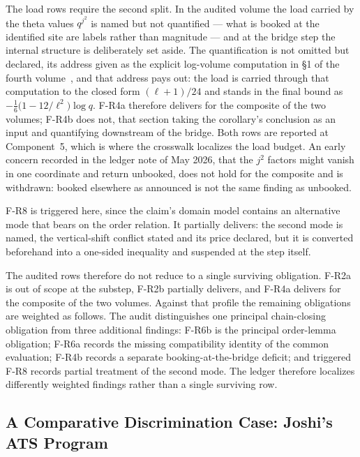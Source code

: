 \documentclass[11pt,a4paper]{article}
\begin{document}
The load rows require the second split. In the audited volume the load carried
by the theta values $q^{j^2}$ is named but not quantified --- what is booked at
the identified site are labels rather than magnitude --- and at the bridge step
the internal structure is deliberately set aside. The quantification is not
omitted but declared, its address given as the explicit log-volume computation
in \S1 of the fourth volume~\cite{Mochizuki2021d}, and that address pays out:
the load is carried through that computation to the closed form $(\ell+1)/24$
and stands in the final bound as
$-\tfrac{1}{6}\bigl(1-12/\ell^{2}\bigr)\log q$. F-R4a therefore delivers for the
composite of the two volumes; F-R4b does not, that section taking the
corollary's conclusion as an input and quantifying downstream of the bridge.
Both rows are reported at Component~5, which is where the crosswalk localizes
the load budget. An early concern recorded in the ledger note of May 2026, that
the $j^2$ factors might vanish in one coordinate and return unbooked, does not
hold for the composite and is withdrawn: booked elsewhere as announced is not
the same finding as unbooked.

F-R8 is triggered here, since the claim's domain model contains an alternative
mode that bears on the order relation. It partially delivers: the second mode is
named, the vertical-shift conflict stated and its price declared, but it is
converted beforehand into a one-sided inequality and suspended at the step
itself.

The audited rows therefore do not reduce to a single surviving obligation.
F-R2a is out of scope at the substep, F-R2b partially delivers, and F-R4a
delivers for the composite of the two volumes. Against that profile the
remaining obligations are weighted as follows. The audit distinguishes one
principal chain-closing obligation from three additional findings: F-R6b is the
principal order-lemma obligation; F-R6a records the missing compatibility
identity of the common evaluation; F-R4b records a separate
booking-at-the-bridge deficit; and triggered F-R8 records partial treatment of
the second mode. The ledger therefore localizes differently weighted findings
rather than a single surviving row.

\subsection{A Comparative Discrimination Case: Joshi's ATS
Program}\label{sec:abc-control}
\end{document}

